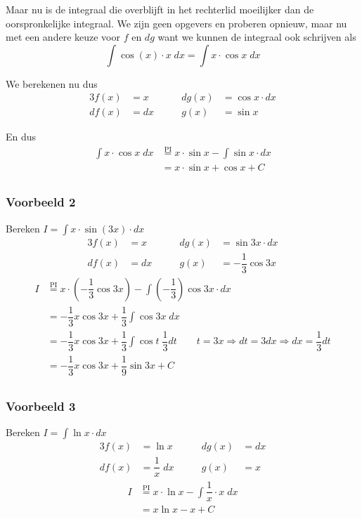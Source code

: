 \documentclass[a4paper,12pt, twoside]{article}
\begin{document}
Maar nu is de integraal die overblijft in het rechterlid moeilijker dan de oorspronkelijke integraal. We zijn geen opgevers en proberen opnieuw, maar nu met een andere keuze voor $f$ en $dg$ want we kunnen de integraal ook schrijven als
$$\int \cos(x)\cdot x\;dx = \int x\cdot \cos x\;dx$$

We berekenen nu dus
\begin{alignat*}{3}
  f(x) &= x \qquad & dg(x) &= \cos x\cdot dx\\
  df(x) &= dx \qquad & g(x) &= \sin x
\end{alignat*}

\vspace{-0.5cm}
En dus
\begin{align*}
  \int x \cdot \cos x \;dx
  &\overset{\text{PI}}{=} x\cdot \sin x - \int \sin x \cdot dx\\
  &= x\cdot \sin x + \cos x + C\\
\end{align*}

\subsubsection*{Voorbeeld 2}
Bereken $\displaystyle I=\int x\cdot \sin(3x) \cdot dx$
\begin{alignat*}{3}
  f(x) &= x \qquad & dg(x) &= \sin 3x\cdot dx\\
  df(x) &= dx \qquad & g(x) &= -\dfrac{1}{3} \cos 3x
\end{alignat*}
\begin{align*}
  I
  &\overset{\text{PI}}{=} x\cdot (-\dfrac{1}{3}\cos 3x) - \int (-\dfrac{1}{3})\cos 3x \cdot dx\\
  &= -\dfrac{1}{3}x\cos 3x + \dfrac{1}{3} \int \cos 3x \; dx\\
  &= -\dfrac{1}{3}x\cos 3x + \dfrac{1}{3} \int \cos t \; \dfrac{1}{3}dt \qquad t=3x\Rightarrow dt=3dx \Rightarrow dx=\dfrac{1}{3}dt\\
  &= -\dfrac{1}{3} x \cos 3x + \dfrac{1}{9} \sin 3x + C\\
\end{align*}

\subsubsection*{Voorbeeld 3}
Bereken $\displaystyle I=\int \ln x \cdot dx$
\begin{alignat*}{3}
  f(x) &= \ln x \qquad & dg(x) &=  dx\\
  df(x) &= \dfrac{1}{x} \;dx \qquad & g(x) &= x
\end{alignat*}
\begin{align*}
  I
  &\overset{\text{PI}}{=} x\cdot \ln x - \int \dfrac{1}{x} \cdot x \; dx\\
  &= x\ln x - x + C\\
\end{align*}
\end{document}
